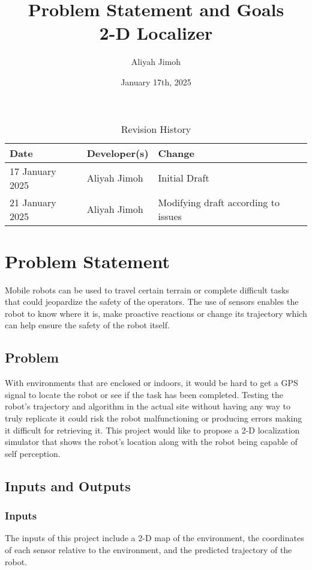 \documentclass{article}
\title{Problem Statement and Goals\\2-D Localizer}
\author{Aliyah Jimoh}
\date{January 17th, 2025}
\begin{document}
\maketitle

\begin{table}[hp]
\caption{Revision History} \label{TblRevisionHistory}
\begin{tabularx}{\textwidth}{llX}
\toprule
\textbf{Date} & \textbf{Developer(s)} & \textbf{Change}\\
\midrule
17 January 2025 & Aliyah Jimoh & Initial Draft\\
21 January 2025 & Aliyah Jimoh & Modifying draft according to issues\\

\bottomrule
\end{tabularx}
\end{table}

\section{Problem Statement}
Mobile robots can be used to travel certain terrain or complete difficult tasks that could jeopardize the safety of the operators. The use of sensors enables the robot to know where it is, make proactive reactions or change its trajectory which can help ensure the safety of the robot itself.

\subsection{Problem}
With environments that are enclosed or indoors, it would be hard to get a GPS signal to locate the robot or see if the task has been completed. Testing the robot's trajectory and algorithm in the actual site without having any way to truly replicate it could risk the robot malfunctioning or producing errors making it difficult for retrieving it. This project would like to propose a 2-D localization simulator that shows the robot's location along with the robot being capable of self perception.

\subsection{Inputs and Outputs}

\subsubsection{Inputs}
The inputs of this project include a 2-D map of the environment, the coordinates of each sensor relative to the environment, and the predicted trajectory of the robot.
\end{document}
